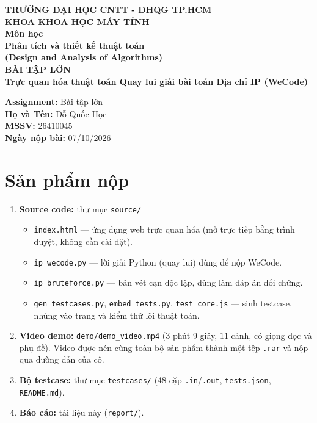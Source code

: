 \documentclass[12pt,a4paper]{article}
\begin{document}
\begin{center}
    \textbf{TRƯỜNG ĐẠI HỌC CNTT - ĐHQG TP.HCM} \\
    \textbf{KHOA KHOA HỌC MÁY TÍNH} \\
    \vspace{1.5cm}
    \textbf{Môn học} \\
    \textbf{Phân tích và thiết kế thuật toán} \\
    \textbf{(Design and Analysis of Algorithms)} \\
    \vspace{1.5cm}
    {\Large \textbf{BÀI TẬP LỚN}} \\[4pt]
    {\large \textbf{Trực quan hóa thuật toán Quay lui giải bài toán Địa chỉ IP (WeCode)}}
\end{center}

\vfill
\noindent
\textbf{Assignment:} Bài tập lớn \\
\textbf{Họ và Tên:} Đỗ Quốc Học \\
\textbf{MSSV:} 26410045 \\
\textbf{Ngày nộp bài:} 07/10/2026

\newpage
\tableofcontents
\newpage

\section{Sản phẩm nộp}

\begin{enumerate}
    \item \textbf{Source code:} thư mục \texttt{source/}
    \begin{itemize}
        \item \texttt{index.html} --- ứng dụng web trực quan hóa (mở trực tiếp bằng trình duyệt, không cần cài đặt).
        \item \texttt{ip\_wecode.py} --- lời giải Python (quay lui) dùng để nộp WeCode.
        \item \texttt{ip\_bruteforce.py} --- bản vét cạn độc lập, dùng làm đáp án đối chứng.
        \item \texttt{gen\_testcases.py}, \texttt{embed\_tests.py}, \texttt{test\_core.js} --- sinh testcase, nhúng vào trang và kiểm thử lõi thuật toán.
    \end{itemize}
    \item \textbf{Video demo:} \texttt{demo/demo\_video.mp4} (3 phút 9 giây, $11$ cảnh, có giọng đọc và phụ đề). Video được nén cùng toàn bộ sản phẩm thành một tệp \texttt{.rar} và nộp qua đường dẫn của cô.
    \item \textbf{Bộ testcase:} thư mục \texttt{testcases/} (48 cặp \texttt{.in}/\texttt{.out}, \texttt{tests.json}, \texttt{README.md}).
    \item \textbf{Báo cáo:} tài liệu này (\texttt{report/}).
\end{enumerate}
\end{document}
